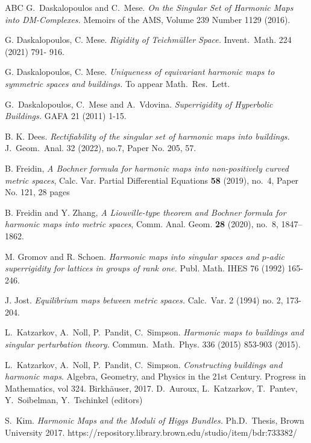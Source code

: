 \documentclass[12pt]{amsart}
\theoremstyle{definition}
\numberwithin{equation}{section}
\begin{document}
\begin{thebibliography}{ABC}
 G.~Daskalopoulos and C.~Mese. {\it On the Singular Set of Harmonic Maps into DM-Complexes.}  Memoirs of the AMS, Volume 239 Number 1129  (2016).


G. Daskalopoulos, C. Mese.  {\it Rigidity of Teichm\"uller Space.}  Invent.~Math. 224 (2021) 791- 916.


G. Daskalopoulos, C. Mese. 
{\it Uniqueness of equivariant harmonic maps to symmetric spaces and buildings.} To appear Math.~Res.~Lett.


 G.~Daskalopoulos, C.~Mese and A.~Vdovina. {\it Superrigidity of Hyperbolic Buildings.} GAFA 21 (2011) 1-15.

B. K. Dees. {\it Rectifiability of the singular set of harmonic maps into buildings.} J.~Geom.~Anal. 32 (2022), no.7, Paper No. 205, 57.

B. Freidin, {\it A Bochner formula for harmonic maps into non-positively curved metric spaces}, Calc. Var. Partial Differential Equations {\bf 58} (2019), no.~4, Paper No. 121, 28 pages

B. Freidin and Y. Zhang, {\it A Liouville-type theorem and Bochner formula for harmonic maps into metric spaces}, Comm. Anal. Geom. {\bf 28} (2020), no.~8, 1847--1862.

 M. Gromov and R. Schoen. {\it Harmonic maps into singular
spaces and $p$-adic superrigidity for lattices in groups of rank
one.} Publ. Math. IHES 76 (1992)  165-246.


J. Jost. {\it Equilibrium maps between metric spaces.} Calc.~Var. 2 (1994) no. 2, 173-204.

L.~Katzarkov, A.~Noll, P.~Pandit, C.~Simpson. {\it Harmonic maps to buildings and singular perturbation theory.} Commun.~Math.~Phys. 336 (2015) 853-903 (2015).

L.~Katzarkov, A.~Noll, P.~Pandit, C.~Simpson.
{\it Constructing buildings and harmonic maps}. 
Algebra, Geometry, and Physics in the 21st Century. Progress in Mathematics, vol 324. Birkhäuser, 2017.
D.~Auroux, L.~Katzarkov, T.~Pantev, Y.~Soibelman, Y.~Tschinkel (editors) 

 S.~Kim.  {\it Harmonic Maps and the Moduli of Higgs Bundles.} Ph.D.~Thesis, Brown University 2017.  
https://repository.library.brown.edu/studio/item/bdr:733382/


\end{thebibliography}
\end{document}
